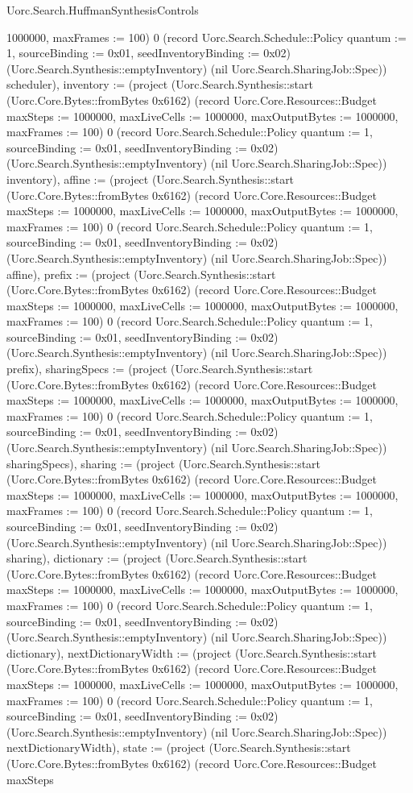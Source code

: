 \begin{lexlean}{Uorc.Search.HuffmanSynthesisControls}
\begin{semanticmodule}
{1000000, maxFrames := 100}) 0 (record Uorc.Search.Schedule::Policy {quantum := 1, sourceBinding := 0x01, seedInventoryBinding := 0x02}) (Uorc.Search.Synthesis::emptyInventory) (nil Uorc.Search.SharingJob::Spec)) scheduler), inventory := (project (Uorc.Search.Synthesis::start (Uorc.Core.Bytes::fromBytes 0x6162) (record Uorc.Core.Resources::Budget {maxSteps := 1000000, maxLiveCells := 1000000, maxOutputBytes := 1000000, maxFrames := 100}) 0 (record Uorc.Search.Schedule::Policy {quantum := 1, sourceBinding := 0x01, seedInventoryBinding := 0x02}) (Uorc.Search.Synthesis::emptyInventory) (nil Uorc.Search.SharingJob::Spec)) inventory), affine := (project (Uorc.Search.Synthesis::start (Uorc.Core.Bytes::fromBytes 0x6162) (record Uorc.Core.Resources::Budget {maxSteps := 1000000, maxLiveCells := 1000000, maxOutputBytes := 1000000, maxFrames := 100}) 0 (record Uorc.Search.Schedule::Policy {quantum := 1, sourceBinding := 0x01, seedInventoryBinding := 0x02}) (Uorc.Search.Synthesis::emptyInventory) (nil Uorc.Search.SharingJob::Spec)) affine), prefix := (project (Uorc.Search.Synthesis::start (Uorc.Core.Bytes::fromBytes 0x6162) (record Uorc.Core.Resources::Budget {maxSteps := 1000000, maxLiveCells := 1000000, maxOutputBytes := 1000000, maxFrames := 100}) 0 (record Uorc.Search.Schedule::Policy {quantum := 1, sourceBinding := 0x01, seedInventoryBinding := 0x02}) (Uorc.Search.Synthesis::emptyInventory) (nil Uorc.Search.SharingJob::Spec)) prefix), sharingSpecs := (project (Uorc.Search.Synthesis::start (Uorc.Core.Bytes::fromBytes 0x6162) (record Uorc.Core.Resources::Budget {maxSteps := 1000000, maxLiveCells := 1000000, maxOutputBytes := 1000000, maxFrames := 100}) 0 (record Uorc.Search.Schedule::Policy {quantum := 1, sourceBinding := 0x01, seedInventoryBinding := 0x02}) (Uorc.Search.Synthesis::emptyInventory) (nil Uorc.Search.SharingJob::Spec)) sharingSpecs), sharing := (project (Uorc.Search.Synthesis::start (Uorc.Core.Bytes::fromBytes 0x6162) (record Uorc.Core.Resources::Budget {maxSteps := 1000000, maxLiveCells := 1000000, maxOutputBytes := 1000000, maxFrames := 100}) 0 (record Uorc.Search.Schedule::Policy {quantum := 1, sourceBinding := 0x01, seedInventoryBinding := 0x02}) (Uorc.Search.Synthesis::emptyInventory) (nil Uorc.Search.SharingJob::Spec)) sharing), dictionary := (project (Uorc.Search.Synthesis::start (Uorc.Core.Bytes::fromBytes 0x6162) (record Uorc.Core.Resources::Budget {maxSteps := 1000000, maxLiveCells := 1000000, maxOutputBytes := 1000000, maxFrames := 100}) 0 (record Uorc.Search.Schedule::Policy {quantum := 1, sourceBinding := 0x01, seedInventoryBinding := 0x02}) (Uorc.Search.Synthesis::emptyInventory) (nil Uorc.Search.SharingJob::Spec)) dictionary), nextDictionaryWidth := (project (Uorc.Search.Synthesis::start (Uorc.Core.Bytes::fromBytes 0x6162) (record Uorc.Core.Resources::Budget {maxSteps := 1000000, maxLiveCells := 1000000, maxOutputBytes := 1000000, maxFrames := 100}) 0 (record Uorc.Search.Schedule::Policy {quantum := 1, sourceBinding := 0x01, seedInventoryBinding := 0x02}) (Uorc.Search.Synthesis::emptyInventory) (nil Uorc.Search.SharingJob::Spec)) nextDictionaryWidth), state := (project (Uorc.Search.Synthesis::start (Uorc.Core.Bytes::fromBytes 0x6162) (record Uorc.Core.Resources::Budget {maxSteps }
\end{semanticmodule}
\end{lexlean}
